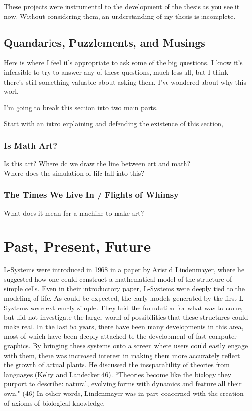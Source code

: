 \documentclass[12pt,twoside]{reedthesis}
\begin{document}
	These projects were instrumental to the development of the thesis as you see it now. Without considering them, an understanding of my thesis is incomplete.\\

\section{Quandaries, Puzzlements, and Musings}

Here is where I feel it's appropriate to ask some of the big questions. I know it's infeasible to try to answer any of these questions, much less all, but I think there's still something valuable about asking them. I've wondered about why this work 

I'm going to break this section into two main parts.

Start with an intro explaining and defending the existence of this section,\\

\subsection{Is Math Art?}

Is this art? Where do we draw the line between art and math?\\
Where does the simulation of life fall into this?

\subsection{The Times We Live In / Flights of Whimsy}

What does it mean for a machine to make art?\\


\chapter{Past, Present, Future}

	L-Systems were introduced in 1968 in a paper by Aristid Lindenmayer, where he suggested how one could construct a mathematical model of the structure of simple cells. Even in their introductory paper, L-Systems were deeply tied to the modeling of life. As could be expected, the early models generated by the first L-Systems were extremely simple. They laid the foundation for what was to come, but did not investigate the larger world of possibilities that these structures could make real. In the last 55 years, there have been many developments in this area, most of which have been deeply attached to the development of fast computer graphics. By bringing these systems onto a screen where users could easily engage with them, there was increased interest in making them more accurately reflect the growth of actual plants. He discussed the inseparability of theories from languages (Kelty and Landecker 46). ``Theories become like the biology they purport to describe: natural, evolving forms with dynamics and feature all their own." (46) In other words, Lindenmayer was in part concerned with the creation of axioms of biological knowledge.\\
	
\end{document}
